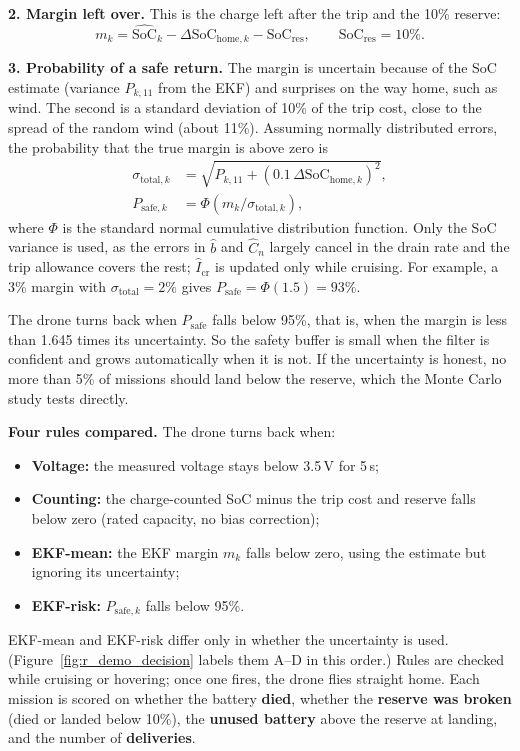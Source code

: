 \label{sec:m_rth_prob}\textbf{2. Margin left over.} This is the charge left after the trip and the 10\% reserve:
\begin{equation}
  m_k = \widehat{\mathrm{SoC}}_k - \Delta\mathrm{SoC}_{\text{home},k} - \mathrm{SoC}_{\text{res}}, \qquad \mathrm{SoC}_{\text{res}} = 10\%.
  \label{eq:m_margin}
\end{equation}

\textbf{3. Probability of a safe return.} The margin is uncertain because of the SoC estimate (variance $P_{k,11}$ from the EKF) and surprises on the way home, such as wind. The second is a standard deviation of 10\% of the trip cost, close to the spread of the random wind (about 11\%). Assuming normally distributed errors, the probability that the true margin is above zero is
\begin{align}
  \sigma_{\text{total},k} &= \sqrt{P_{k,11} + \left(0.1\, \Delta\mathrm{SoC}_{\text{home},k}\right)^2}, \label{eq:m_sigma_total}\\
  P_{\text{safe},k} &= \Phi\!\left(m_k / \sigma_{\text{total},k}\right), \label{eq:m_psafe}
\end{align}
where $\Phi$ is the standard normal cumulative distribution function. Only the SoC variance is used, as the errors in $\hat{b}$ and $\hat{C}_n$ largely cancel in the drain rate and the trip allowance covers the rest; $\hat{I}_{\text{cr}}$ is updated only while cruising. For example, a 3\% margin with $\sigma_{\text{total}} = 2\%$ gives $P_{\text{safe}} = \Phi(1.5) = 93\%$.

The drone turns back when $P_{\text{safe}}$ falls below 95\%, that is, when the margin is less than 1.645 times its uncertainty. So the safety buffer is small when the filter is confident and grows automatically when it is not. If the uncertainty is honest, no more than 5\% of missions should land below the reserve, which the Monte Carlo study tests directly.

\label{sec:m_policies}\textbf{Four rules compared.} The drone turns back when:
\begin{itemize}
  \item \textbf{Voltage:} the measured voltage stays below 3.5\,V for 5\,s;
  \item \textbf{Counting:} the charge-counted SoC minus the trip cost and reserve falls below zero (rated capacity, no bias correction);
  \item \textbf{EKF-mean:} the EKF margin $m_k$ falls below zero, using the estimate but ignoring its uncertainty;
  \item \textbf{EKF-risk:} $P_{\text{safe},k}$ falls below 95\%.
\end{itemize}
EKF-mean and EKF-risk differ only in whether the uncertainty is used. (Figure~\ref{fig:r_demo_decision} labels them A--D in this order.) Rules are checked while cruising or hovering; once one fires, the drone flies straight home. \label{sec:m_scoring}Each mission is scored on whether the battery \textbf{died}, whether the \textbf{reserve was broken} (died or landed below 10\%), the \textbf{unused battery} above the reserve at landing, and the number of \textbf{deliveries}.


